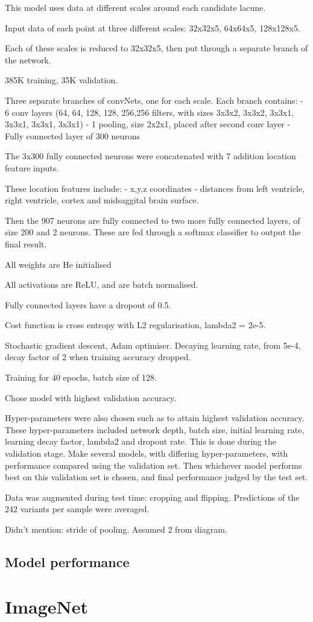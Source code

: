 This model uses data at different scales around each candidate lacune. 

Input data of each point at three different scales: 32x32x5, 64x64x5, 128x128x5.

Each of these scales is reduced to 32x32x5, then put through a separate branch of the network.

385K training, 35K validation.

Three separate branches of convNets, one for each scale. Each branch contains:
 - 6 conv layers (64, 64, 128, 128, 256,256 filters, with sizes 3x3x2, 3x3x2, 3x3x1, 3x3x1, 3x3x1, 3x3x1)
 - 1 pooling, size 2x2x1, placed after second conv layer
 - Fully connected layer of 300 neurons
 
 The 3x300 fully connected neurons were concatenated with 7 addition location feature inputs.
 
 These location features include:
  - x,y,z coordinates
  - distances from left ventricle, right ventricle, cortex and midsaggital brain surface.

Then the 907 neurons are fully connected to two more fully connected layers, of size 200 and 2 neurons. 
These are fed through a softmax classifier to output the final result.

All weights are He initialised 

All activations are ReLU, and are batch normalised.

Fully connected layers have a dropout of 0.5.

Cost function is cross entropy with L2 regularisation, lambda2 = 2e-5. 

Stochastic gradient descent, Adam optimiser. Decaying learning rate, from 5e-4, decay factor of 2 when training accuracy dropped. 

Training for 40 epochs, batch size of 128.

Chose model with highest validation accuracy. 

Hyper-parameters were also chosen such as to attain highest validation accuracy. These hyper-parameters included network depth, batch size, initial learning rate, learning decay factor, lambda2 and dropout rate. This is done during the validation stage. Make several models, with differing hyper-parameters, with performance compared using the validation set. Then whichever model performs best on this validation set is chosen, and final performance judged by the test set.

Data was augmented during test time: cropping and flipping. Predictions of the 242 variants per sample were averaged.

Didn't mention: stride of pooling. Assumed 2 from diagram.
 
\subsection{Model performance}
 
\section{ImageNet}



